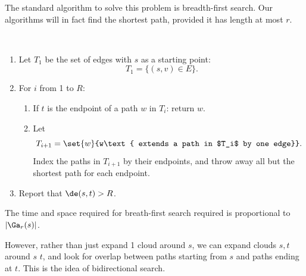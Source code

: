 The standard algorithm to solve this problem is breadth-first search. Our algorithms will in fact find the shortest path, provided it has length at most $r$.
\begin{alg}$\,$
\begin{enumerate}
\item
Let $T_1$ be the set of edges with $s$ as a starting point:
\[
T_1=\{(s,v)\in E\}.
\]
\item For $i$ from 1 to $R$:
\begin{enumerate}
\item If $t$ is the endpoint of a path $w$ in $T_i$: return $w$.
\item Let 
\[T_{i+1}=\set{w}{w\text{ extends a path in $T_i$ by one edge}}.\]
Index the paths in $T_{i+1}$ by their endpoints, and throw away all but the shortest path for each endpoint.
\end{enumerate}
\item Report that $\de(s,t)>R$.
\end{enumerate}
\end{alg}
The time and space required for breath-first search required is proportional to $|\Ga_r(s)|$.

However, rather than just expand 1 cloud around $s$, we can expand clouds $s,t$ around $s$  $t$, and look for overlap between paths starting from $s$ and paths ending at $t$. This is the idea of bidirectional search.


